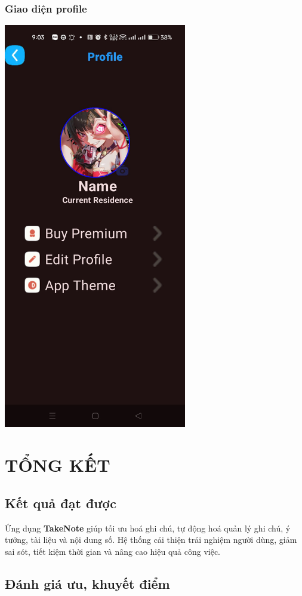 \documentclass[a4paper,12pt]{article}
\begin{document}
\subsubsection{Giao diện profile}
\includegraphics[width=0.6\textwidth]{profile.png}

\clearpage
\section{TỔNG KẾT}
\subsection{Kết quả đạt được}
Ứng dụng \textbf{TakeNote} giúp tối ưu hoá ghi chú, tự động hoá quản lý ghi chú, ý tưởng, tài liệu và nội dung số. Hệ thống cải thiện trải nghiệm người dùng, giảm sai sót, tiết kiệm thời gian và nâng cao hiệu quả công việc.

\subsection{Đánh giá ưu, khuyết điểm}
\end{document}
